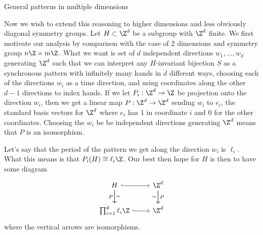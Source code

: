 \documentclass[12nt]{article}
\theoremstyle{plain}
\begin{document}
\newpage
\begin{subsection}{General patterns in multiple dimensions}

Now we wish to extend this reasoning to higher dimensions and less obviously diagonal symmetry groups. Let $H \subset \Z^d$ be a subgroup with $\Z^d$ finite. We first motivate our analysis by comparison with the case of 2 dimensions and symmetry group $n\Z \times m\Z$. What we want is set of $d$ independent directions $w_1, \dots, w_d$ generating $\Z^d$ such that we can interpret any $H$-invariant bijection $S$ as a synchronous pattern with infinitely many hands in $d$ different ways, choosing each of the directions $w_i$ as a time direction, and using coordinates along the other $d - 1$ directions to index hands. If we let $P_i : \Z^d \to \Z$ be projection onto the direction $w_i$, then we get a linear map $P : \Z^d \to \Z^d$ sending $w_i$ to $e_i$, the standard basis vectors for $\Z^d$ where $e_i$ has 1 in coordinate $i$ and 0 for the other coordinates. Choosing the $w_i$ be be independent directions generating $\Z^d$ means that $P$ is an isomorphism. 

Let's say that the period of the pattern we get along the direction $w_i$ is $\ell_i$. What this means is that $P_i(H) \cong \ell_i \Z$. Our best then hope for $H$ is then to have some diagram
\[
\begin{tikzcd}
H \ar[r, hookrightarrow] \ar[d, "P"'] \ar[d, "\sim"] & \Z^d \ar[d, "P"] \ar[d, "\sim"']  \\
\prod_{i=1}^d \ell_i \Z \ar[r, hookrightarrow] & \Z^d
\end{tikzcd}
\]
where the vertical arrows are isomorphisms. 


\end{subsection}
\end{document}
